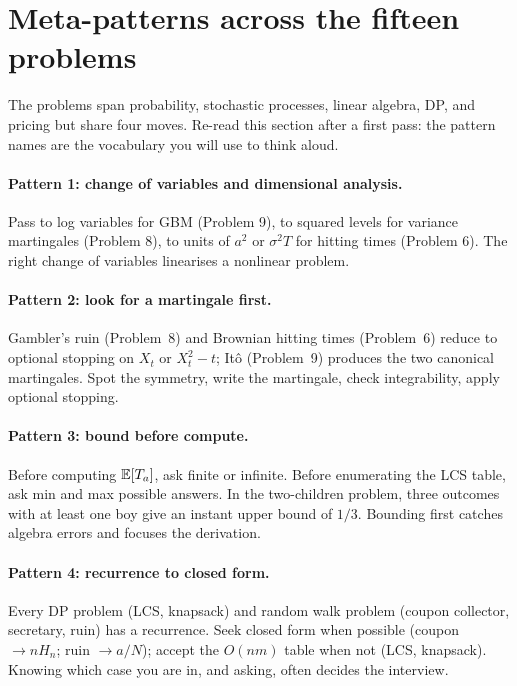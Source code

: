 \section{Meta-patterns across the fifteen problems}
\label{sec:meta}

The problems span probability, stochastic processes, linear
algebra, DP, and pricing but share four moves.  Re-read this
section after a first pass: the pattern names are the vocabulary
you will use to think aloud.

\paragraph{Pattern 1: change of variables and dimensional analysis.}
Pass to log variables for GBM (Problem 9), to squared levels for
variance martingales (Problem 8), to units of $a^2$ or $\sigma^2
T$ for hitting times (Problem 6).  The right change of variables
linearises a nonlinear problem.

\paragraph{Pattern 2: look for a martingale first.}
Gambler's ruin (Problem~8) and Brownian hitting times (Problem~6)
reduce to optional stopping on $X_t$ or $X_t^2 - t$; It\^o
(Problem~9) produces the two canonical martingales.  Spot the
symmetry, write the martingale, check integrability, apply
optional stopping.

\paragraph{Pattern 3: bound before compute.}
Before computing $\mathbb{E}[T_a]$, ask finite or infinite.  Before
enumerating the LCS table, ask min and max possible answers.  In
the two-children problem, three outcomes with at least one boy
give an instant upper bound of $1/3$.  Bounding first catches
algebra errors and focuses the derivation.

\paragraph{Pattern 4: recurrence to closed form.}
Every DP problem (LCS, knapsack) and random walk problem (coupon
collector, secretary, ruin) has a recurrence.  Seek closed form
when possible (coupon $\to n H_n$; ruin $\to a/N$); accept the
$O(nm)$ table when not (LCS, knapsack).  Knowing which case you
are in, and asking, often decides the interview.

